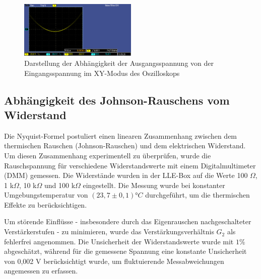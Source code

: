 \begin{figure}[htbp]
    \centering
    \includegraphics[width=0.5\textwidth]{figs/johnson parabel.png}
    \caption{Darstellung der Abhängigkeit der Ausgangsspannung von der Eingangsspannung im XY-Modus des Oszilloskops}
    \label{fig:parabel}
\end{figure}
\FloatBarrier
\subsection{Abhängigkeit des Johnson-Rauschens vom Widerstand}
Die Nyquist-Formel postuliert einen linearen Zusammenhang zwischen dem thermischen Rauschen (Johnson-Rauschen) und dem elektrischen Widerstand. Um diesen Zusammenhang experimentell zu überprüfen, wurde die Rauschspannung für verschiedene Widerstandswerte mit einem Digitalmultimeter (DMM) gemessen. Die Widerstände wurden in der LLE-Box auf die Werte 100 $\Omega$, 1 k$\Omega$, 10 k$\Omega$ und 100 k$\Omega$ eingestellt. Die Messung wurde bei konstanter Umgebungstemperatur von $(23,7 ± 0,1) °C$ durchgeführt, um die thermischen Effekte zu berücksichtigen.

Um störende Einflüsse - insbesondere durch das Eigenrauschen nachgeschalteter Verstärkerstufen - zu minimieren, wurde das Verstärkungsverhältnis $G_2$ als fehlerfrei angenommen. Die Unsicherheit der Widerstandswerte wurde mit $1\%$ abgeschätzt, während für die gemessene Spannung eine konstante Unsicherheit von 0,002 V berücksichtigt wurde, um fluktuierende Messabweichungen angemessen zu erfassen.

